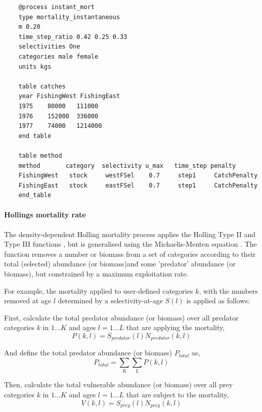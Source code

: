 {\small{\begin{verbatim}
	@process instant_mort
	type mortality_instantaneous
	m 0.20
	time_step_ratio 0.42 0.25 0.33
	selectivities One
	categories male female
	units kgs

	table catches
	year FishingWest FishingEast
	1975	80000	111000
	1976	152000	336000
	1977	74000	1214000
	end table

	table method
	method       category  selectivity u_max   time_step penalty
	FishingWest   stock     westFSel    0.7     step1     CatchPenalty
	FishingEast   stock     eastFSel    0.7     step1     CatchPenalty
	end_table
	\end{verbatim}}}

\paragraph{Hollings mortality rate}

The density-dependent Holling mortality process applies the Holling Type II and Type III functions \citep{Holling1959}, but is generalised using the Michaelis-Menten equation \citep{MentenMichaelis1913}. The function removes a number or biomass from a set of categories according to their total (selected) abundance (or biomass)and some 'predator' abundance (or biomass), but constrained by a maximum exploitation rate.

For example, the mortality applied to user-defined categories $k$, with the numbers removed at age $l$ determined by a selectivity-at-age $S(l)$ is applied as follows:

First, calculate the total predator abundance (or biomass) over all predator categories $k$ in $1 \ldots K$ and ages $l = 1 \ldots L$ that are applying the mortality,
\begin{equation}
	P(k,l) = S_{predator}(l) N_{predator}(k,l)
\end{equation}

And define the total predator abundance (or biomass) $P_{total}$ as,
\begin{equation}
	P_{total}  = \sum\limits_K {\sum\limits_L {P(k,l)}} 
\end{equation}

Then, calculate the total vulnerable abundance (or biomass) over all prey categories $k$ in $1 \ldots K$ and ages $l = 1 \ldots L$ that are subject to the mortality,
\begin{equation}
	V(k,l) = S_{prey}(l) N_{prey}(k,l)
\end{equation}

